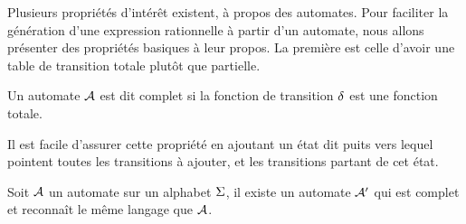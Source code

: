 Plusieurs propriétés d'intérêt existent, à propos des automates. Pour faciliter
la génération d'une expression rationnelle à partir d'un automate, nous allons
présenter des propriétés basiques à leur propos. La première est celle
d'avoir une table de transition totale plutôt que partielle.

\begin{definition}
  Un automate $\mathcal{A}$ est dit complet si la fonction de transition $\delta_{}$ est
  une fonction totale.
\end{definition}

Il est facile d'assurer cette propriété en ajoutant un état dit \og puits\fg
vers lequel pointent toutes les transitions à ajouter, et les transitions
partant de cet état.

\begin{proposition}
  Soit $\mathcal{A}$ un automate sur un alphabet $\Sigma$, il existe un automate
  $\mathcal{A}'$ qui est complet et reconnaît le même langage que $\mathcal{A}$.
\end{proposition}

